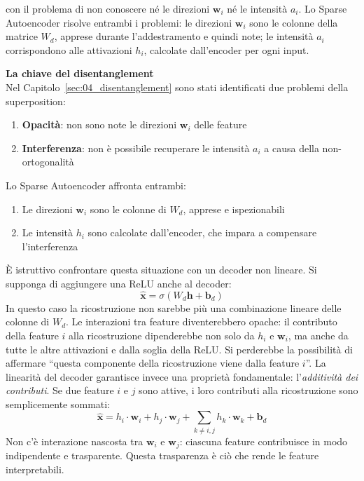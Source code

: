 con il problema di non conoscere né le direzioni $\mathbf{w}_i$ né le intensità $a_i$. Lo Sparse Autoencoder risolve entrambi i problemi: le direzioni $\mathbf{w}_i$ sono le colonne della matrice $W_d$, apprese durante l'addestramento e quindi note; le intensità $a_i$ corrispondono alle attivazioni $h_i$, calcolate dall'encoder per ogni input.
\begin{notebox}
\textbf{La chiave del disentanglement}\\
Nel Capitolo~\ref{sec:04_disentanglement} sono stati identificati due problemi della superposition:
\begin{enumerate}
    \item \textbf{Opacità}: non sono note le direzioni $\mathbf{w}_i$ delle feature
    \item \textbf{Interferenza}: non è possibile recuperare le intensità $a_i$ a causa della non-ortogonalità
\end{enumerate}
Lo Sparse Autoencoder affronta entrambi:
\begin{enumerate}
    \item Le direzioni $\mathbf{w}_i$ sono le colonne di $W_d$, apprese e ispezionabili
    \item Le intensità $h_i$ sono calcolate dall'encoder, che impara a compensare l'interferenza
\end{enumerate}
\end{notebox}
È istruttivo confrontare questa situazione con un decoder non lineare. Si supponga di aggiungere una ReLU anche al decoder:
\begin{equation}
    \hat{\mathbf{x}} = \sigma(W_d \mathbf{h} + \mathbf{b}_d)
\end{equation}
In questo caso la ricostruzione non sarebbe più una combinazione lineare delle colonne di $W_d$. Le interazioni tra feature diventerebbero opache: il contributo della feature $i$ alla ricostruzione dipenderebbe non solo da $h_i$ e $\mathbf{w}_i$, ma anche da tutte le altre attivazioni e dalla soglia della ReLU. Si perderebbe la possibilità di affermare ``questa componente della ricostruzione viene dalla feature $i$''.
La linearità del decoder garantisce invece una proprietà fondamentale: l'\textit{additività dei contributi}. Se due feature $i$ e $j$ sono attive, i loro contributi alla ricostruzione sono semplicemente sommati:
\begin{equation}
    \hat{\mathbf{x}} = h_i \cdot \mathbf{w}_i + h_j \cdot \mathbf{w}_j + \sum_{k \neq i,j} h_k \cdot \mathbf{w}_k + \mathbf{b}_d
\end{equation}
Non c'è interazione nascosta tra $\mathbf{w}_i$ e $\mathbf{w}_j$: ciascuna feature contribuisce in modo indipendente e trasparente. Questa trasparenza è ciò che rende le feature interpretabili.

